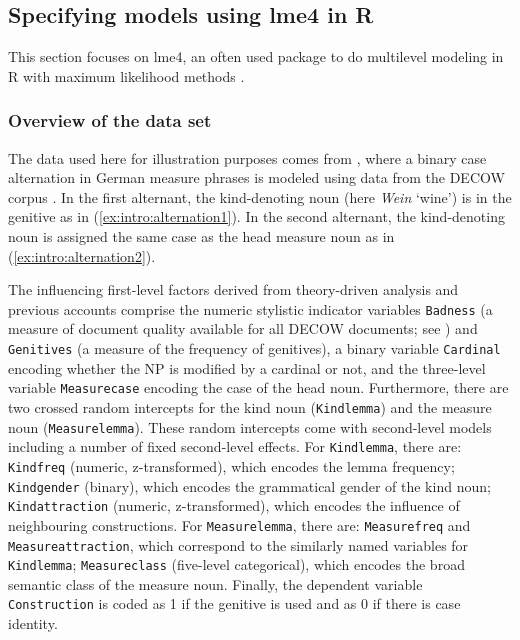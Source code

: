 \subsection{Specifying models using lme4 in R}
\label{sec:specifyingmodelsusinglme4inr}

This section focuses on lme4, an often used package to do multilevel modeling in R with maximum likelihood methods \citep{BatesEa2015}.

\subsubsection{Overview of the data set}

The data used here for illustration purposes comes from \citet{Schaefer2018}, where a binary case alternation in German measure phrases is modeled using data from the DECOW corpus \citep{SchaeferBildhauer2012}.
In the first alternant, the kind-denoting noun (here \textit{Wein} `wine') is in the genitive as in (\ref{ex:intro:alternation1}).
In the second alternant, the kind-denoting noun is assigned the same case as the head measure noun as in (\ref{ex:intro:alternation2}).

\begin{exe}
  \ex\label{ex:intro:alternation}
  \begin{xlist}
  \end{xlist}
\end{exe}

The influencing first-level factors derived from theory-driven analysis and previous accounts comprise the numeric stylistic indicator variables \texttt{Badness} (a measure of document quality available for all DECOW documents; see \citealt{SchaeferEa2013}) and \texttt{Genitives} (a measure of the frequency of genitives), a binary variable \texttt{Cardinal} encoding whether the NP is modified by a cardinal or not, and the three-level variable \texttt{Measurecase} encoding the case of the head noun.
Furthermore, there are two crossed random intercepts for the kind noun (\texttt{Kindlemma}) and the measure noun (\texttt{Measurelemma}).
These random intercepts come with second-level models including a number of fixed second-level effects.
For \texttt{Kindlemma}, there are: \texttt{Kindfreq} (numeric, z-transformed), which encodes the lemma frequency; \texttt{Kindgender} (binary), which encodes the grammatical gender of the kind noun; \texttt{Kindattraction} (numeric, z-transformed), which encodes the influence of neighbouring constructions.
For \texttt{Measurelemma}, there are: \texttt{Measurefreq} and \texttt{Measureattraction}, which correspond to the similarly named variables for \texttt{Kindlemma}; \texttt{Measureclass} (five-level categorical), which encodes the broad semantic class of the measure noun.
Finally, the dependent variable \texttt{Construction} is coded as 1 if the genitive is used and as 0 if there is case identity.

